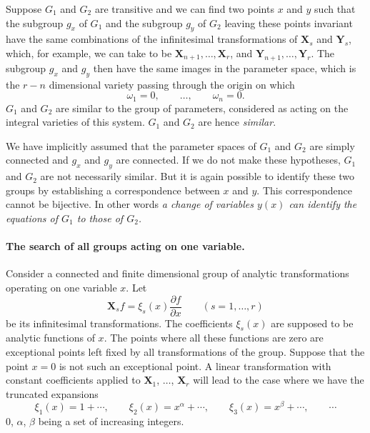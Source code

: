 \documentclass[leqno,11pt]{book}
\numberwithin{equation}{chapter}
\newcommand{\pd}{\partial}
\theoremstyle{shape1}
\theoremstyle{shapesmall}
\begin{document}
Suppose $G_{1}$ and $G_{2}$ are transitive and we can find two points $x$ and $y$ such that the subgroup $g_{x}$ of $G_{1}$ and the subgroup $g_{y}$ of $G_{2}$ leaving these points invariant have the same combinations of the infinitesimal transformations of $\mathbf{X}_{s}$ and $\mathbf{Y}_{s}$, which, for example, we can take to be $\mathbf{X}_{n+1},\dots,\mathbf{X}_{r}$, and $\mathbf{Y}_{n+1},\dots,\mathbf{Y}_{r}$. The subgroup $g_{x}$ and $g_{y}$ then have the same images in the parameter space, which is the $r-n$ dimensional variety passing through the origin on which
\[
\omega_{1}=0,\qquad\dots,\qquad\omega_{n}=0.
\]
$G_{1}$ and $G_{2}$ are similar to the group of parameters, considered as acting on the integral varieties of this system. $G_{1}$ and $G_{2}$ are hence \emph{similar}.

We have implicitly assumed that the parameter spaces of $G_{1}$ and $G_{2}$ are simply connected and $g_{x}$ and $g_{y}$ are connected. If we do not make these hypotheses, $G_{1}$ and $G_{2}$ are not necessarily similar. But it is again possible to identify these two groups by establishing a correspondence between $x$ and $y$. This correspondence cannot be bijective. In other words \emph{a change of variables $y(x)$ can identify the equations of $G_{1}$ to those of $G_{2}$.}

\paragraph{The search of all groups acting on one variable.}
\label{sec:214}
Consider a connected and finite dimensional group of analytic transformations operating on one variable $x$. Let
\[
\mathbf{X}_{s}f=\xi_{s}(x)\frac{\pd f}{\pd x}\qquad(s=1,\dots, r)
\]
be its infinitesimal transformations. The coefficients $\xi_{s}(x)$ are supposed to be analytic functions of $x$. The points where all these functions are zero are exceptional points left fixed by all transformations of the group. Suppose that the point $x=0$ is not such an exceptional point. A linear transformation with constant coefficients applied to $\mathbf{X}_{1}$, $\dots$, $\mathbf{X}_{r}$ will lead to the case where we have the truncated expansions
\[
\xi_{1}(x)=1+\cdots,\qquad  \xi_{2}(x)=x^{\alpha}+\cdots,\qquad \xi_{3}(x)=x^{\beta}+\cdots,\qquad \cdots
\]
$0$, $\alpha$, $\beta$ being a set of increasing integers.
\end{document}
